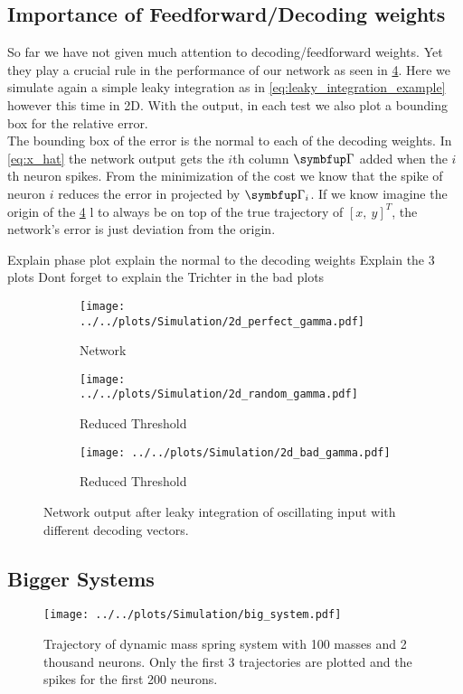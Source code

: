 \subsection{Importance of Feedforward/Decoding weights}
So far we have not given much attention to decoding/feedforward weights. Yet they play a crucial rule in the performance of our network as seen in \cref{fig:sim_res_3}. Here we simulate again a simple leaky integration as in \cref{eq:leaky_integration_example} however this time in 2D. With the output, in each test we also plot a bounding box for the relative error.\\
The bounding box of the error is the normal to each of the decoding weights. In \cref{eq:x_hat} the network output gets the $i$th column $\bmu{\Gamma}$ added when the $i$th neuron spikes. From the minimization of the cost we know that the spike of neuron $i$ reduces the error in projected by $\bmu{\Gamma}_i$. If we know imagine the origin of the \cref{fig:sim_res_3} l to always be on top of the true trajectory of $\left[x ,\ y\right]^T$, the network's error is just deviation from the origin.

Explain phase plot
explain the normal to the decoding weights
Explain the 3 plots
Dont forget to explain the Trichter in the bad plots
\begin{figure}[h!]
		\centering
	\begin{subfigure}[t]{0.6\textwidth}
		\centering
		\texttt{[image: ../../plots/Simulation/2d\_perfect\_gamma.pdf]}
		\caption{Network }
		\label{fig:sim_perfect_gamma}
	\end{subfigure}
	\hfill
	\begin{subfigure}[t]{0.6\textwidth}
		\centering
		\texttt{[image: ../../plots/Simulation/2d\_random\_gamma.pdf]}
		\caption{Reduced Threshold}
		\label{fig:sim_random_gamma}
	\end{subfigure}
	\hfill
\begin{subfigure}[t]{0.6\textwidth}
	\centering
	\texttt{[image: ../../plots/Simulation/2d\_bad\_gamma.pdf]}
	\caption{Reduced Threshold}
	\label{fig:sim_bad_gamma}
\end{subfigure}
	\caption{Network output after leaky integration of oscillating input with different decoding vectors.}
	\label{fig:sim_res_3}
\end{figure}


\subsection{Bigger Systems}
\begin{figure}[h!]
	\centering
		\texttt{[image: ../../plots/Simulation/big\_system.pdf]}
	\caption{Trajectory of dynamic mass spring system with 100 masses and 2 thousand neurons. Only the first 3 trajectories are plotted and the spikes for the first 200 neurons.	}
	\label{fig:big_systems}
\end{figure}

